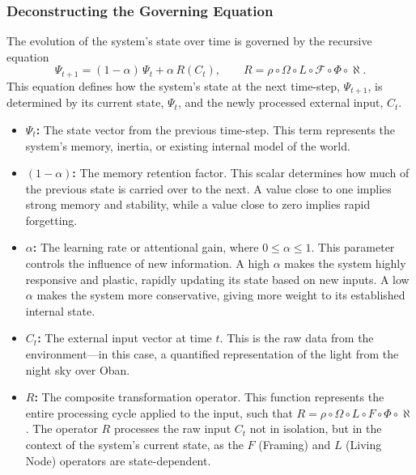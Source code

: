 \documentclass{article}
\newcommand{\Psit}{\Psi_t}
\newcommand{\Psitp}{\Psi_{t+1}}
\newcommand{\Ct}{C_t}
\newcommand{\Rt}{R}
\begin{document}
\subsubsection{Deconstructing the Governing Equation}

The evolution of the system's state over time is governed by the recursive equation
\[
    \Psitp = (1-\alpha)\,\Psit + \alpha\,\Rt(\Ct),
    \qquad
    \Rt = \rho\circ\Omega\circ L\circ \mathcal{F}\circ\Phi\circ\aleph .
\]
This equation defines how the system's state at the next time-step, $\Psi_{t+1}$, is determined by its current state, $\Psi_t$, and the newly processed external input, $C_t$.

\begin{itemize}
    \item \textbf{$\Psi_t$:} The state vector from the previous time-step. This term represents the system's memory, inertia, or existing internal model of the world.
    \item \textbf{$(1-\alpha)$:} The memory retention factor. This scalar determines how much of the previous state is carried over to the next. A value close to one implies strong memory and stability, while a value close to zero implies rapid forgetting.
    \item \textbf{$\alpha$:} The learning rate or attentional gain, where $0 \leq \alpha \leq 1$. This parameter controls the influence of new information. A high $\alpha$ makes the system highly responsive and plastic, rapidly updating its state based on new inputs. A low $\alpha$ makes the system more conservative, giving more weight to its established internal state.
    \item \textbf{$C_t$:} The external input vector at time $t$. This is the raw data from the environment---in this case, a quantified representation of the light from the night sky over Oban.
    \item \textbf{$R$:} The composite transformation operator. This function represents the entire processing cycle applied to the input, such that $R = \rho \circ \Omega \circ L \circ F \circ \Phi \circ \aleph$. The operator $R$ processes the raw input $C_t$ not in isolation, but in the context of the system's current state, as the $F$ (Framing) and $L$ (Living Node) operators are state-dependent.
\end{itemize}
\end{document}
